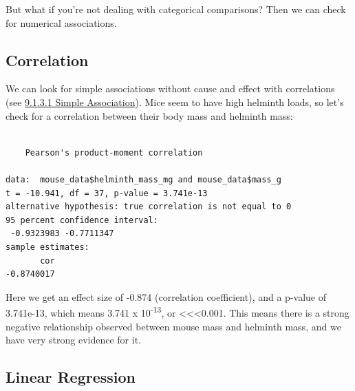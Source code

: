 \documentclass[
  letterpaper,
  DIV=11,
  numbers=noendperiod]{scrreprt}
\newenvironment{Shaded}{\begin{snugshade}}{\end{snugshade}}
\newcommand{\DocumentationTok}[1]{\textcolor[rgb]{0.37,0.37,0.37}{\textit{#1}}}
\newcommand{\FunctionTok}[1]{\textcolor[rgb]{0.28,0.35,0.67}{#1}}
\newcommand{\NormalTok}[1]{\textcolor[rgb]{0.00,0.23,0.31}{#1}}
\newcommand{\OtherTok}[1]{\textcolor[rgb]{0.00,0.23,0.31}{#1}}
\newcommand{\SpecialCharTok}[1]{\textcolor[rgb]{0.37,0.37,0.37}{#1}}
\newcommand{\StringTok}[1]{\textcolor[rgb]{0.13,0.47,0.30}{#1}}
\begin{document}
But what if you're not dealing with categorical comparisons? Then we can
check for numerical associations.

\subsection{Correlation}\label{correlation}

We can look for simple associations without cause and effect with
correlations (see \hyperref[sec-corr]{9.1.3.1 Simple Association}). Mice
seem to have high helminth loads, so let's check for a correlation
between their body mass and helminth mass:

\begin{Shaded}
\end{Shaded}

\begin{verbatim}

    Pearson's product-moment correlation

data:  mouse_data$helminth_mass_mg and mouse_data$mass_g
t = -10.941, df = 37, p-value = 3.741e-13
alternative hypothesis: true correlation is not equal to 0
95 percent confidence interval:
 -0.9323983 -0.7711347
sample estimates:
       cor 
-0.8740017 
\end{verbatim}

Here we get an effect size of -0.874 (correlation coefficient), and a
p-value of 3.741e-13, which means 3.741 x 10\textsuperscript{-13}, or
\textless\textless\textless0.001. This means there is a strong negative
relationship observed between mouse mass and helminth mass, and we have
very strong evidence for it.

\subsection{Linear Regression}\label{linear-regression}
\end{document}
